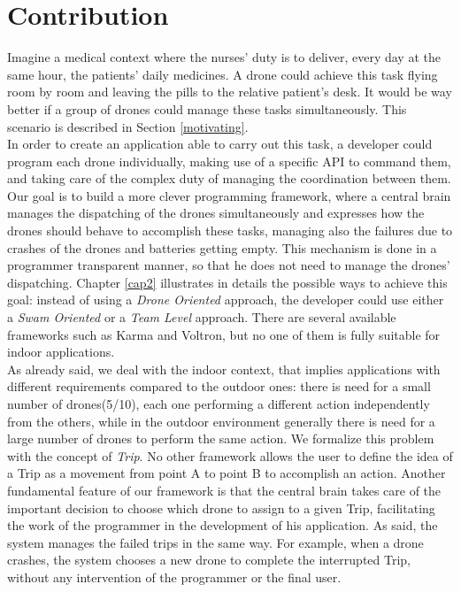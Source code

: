 \section{Contribution}

Imagine a medical context where the nurses' duty is to deliver, every day at the same hour, the patients' daily medicines.
A drone could achieve this task flying room by room and leaving the pills to the relative patient's desk. 
It would be way better if a group of drones could manage these tasks simultaneously.
This scenario is described in Section \ref{motivating}.
\\

In order to create an application able to carry out this task, a developer could program each drone individually, making use of a specific API to command them, and taking care of the complex duty of managing the coordination between them. 
Our goal is to build a more clever programming framework, where a central brain manages the dispatching of the drones simultaneously and expresses how the drones should behave to accomplish these tasks, managing also the failures due to crashes of the drones and batteries getting empty.
This mechanism is done in a programmer transparent manner, so that he does not need to manage the drones' dispatching.
Chapter \ref{cap2} illustrates in details the possible ways to achieve this goal:
instead of using a \textit{Drone Oriented} approach, the developer could use either a \textit{Swam Oriented} or a \textit{Team Level} approach. 
There are several available frameworks such as Karma\cite{karma} and Voltron\cite{voltron}, but no one of them is fully suitable for indoor applications.
\\

As already said, we deal with the indoor context, that implies applications with different requirements compared to the outdoor ones:
there is need for a small number of drones(5/10), each one performing a different action independently from the others, while in the outdoor environment generally there is need for a large number of drones to perform the same action.
We formalize this problem with the concept of \textit{Trip}.
No other framework allows the user to define the idea of a Trip as a movement from point A to point B to accomplish an action.
Another fundamental feature of our framework is that the central brain takes care of the important decision to choose which drone to assign to a given Trip, facilitating the work of the programmer in the development of his application.
As said, the system manages the failed trips in the same way.
For example, when a drone crashes, the system chooses a new drone to complete the interrupted Trip, without any intervention of the programmer or the final user.
\\


